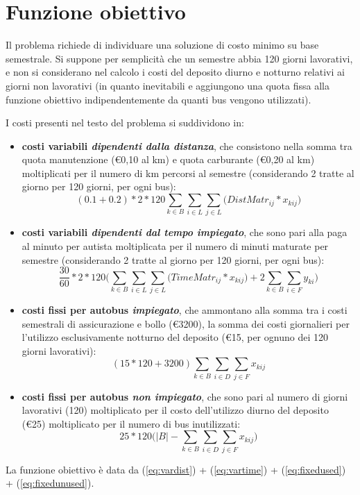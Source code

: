 \section{Funzione obiettivo}
Il problema richiede di individuare una soluzione di costo minimo su base semestrale. Si suppone per semplicità che un semestre abbia 120 giorni lavorativi, e non si considerano nel calcolo i costi del deposito diurno e notturno relativi ai giorni non lavorativi (in quanto inevitabili e aggiungono una quota fissa alla funzione obiettivo indipendentemente da quanti bus vengono utilizzati). 

I costi presenti nel testo del problema si suddividono in:
\begin{itemize}
  \item \textbf{costi variabili \textit{dipendenti dalla distanza}}, che consistono nella somma tra quota manutenzione (€0,10 al km) e quota carburante (€0,20 al km) moltiplicati per il numero di km percorsi al semestre (considerando 2 tratte al giorno per 120 giorni, per ogni bus):
\begin{equation}
  \label{eq:vardist}
  (0.1 + 0.2) * 2 * 120\sum_{k \in B}\sum_{i \in L}\sum_{j \in L}\Big(DistMatr_{ij} * x_{kij}\Big)
\end{equation}
  \item \textbf{costi variabili \textit{dipendenti dal tempo impiegato}}, che sono pari alla paga al minuto per autista moltiplicata per il numero di minuti maturate per semestre (considerando 2 tratte al giorno per 120 giorni, per ogni bus):
\begin{equation}
  \label{eq:vartime}
  \frac{30}{60} * 2 * 120\Bigg(\sum_{k \in B}\sum_{i \in L}\sum_{j \in L}\Big(TimeMatr_{ij} * x_{kij}\Big) + 2\sum_{k \in B}\sum_{i \in F} y_{ki} \Bigg)
\end{equation}
\item \textbf{costi fissi per autobus \textit{impiegato}}, che ammontano alla somma tra i costi semestrali di assicurazione e bollo (€3200), la somma dei costi giornalieri per l'utilizzo esclusivamente notturno del deposito (€15, per ognuno dei 120 giorni lavorativi):
\begin{equation}
  \label{eq:fixedused}
  (15 * 120 + 3200) \sum_{k \in B}\sum_{i \in D}\sum_{j \in F} x_{kij}
\end{equation}
\item \textbf{costi fissi per autobus \textit{non impiegato}}, che sono pari al numero di giorni lavorativi (120) moltiplicato per il costo dell'utilizzo diurno del deposito (€25) moltiplicato per il numero di bus inutilizzati:
\begin{equation}
  \label{eq:fixedunused}
    25 * 120 \Big(|B| - \sum_{k \in B}\sum_{i \in D}\sum_{j \in F} x_{kij}\Big)
  \end{equation}
\end{itemize}
La funzione obiettivo è data da (\ref{eq:vardist}) + (\ref{eq:vartime}) + (\ref{eq:fixedused}) + (\ref{eq:fixedunused}).



